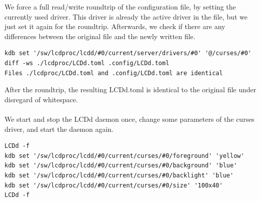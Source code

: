 \documentclass[12pt]{report}
\begin{document}
We force a full read/write roundtrip of the configuration file, by setting the currently used driver. This driver is already the active driver in the file, but we just set it again for the roundtrip.
Afterwards, we check if there are any differences between the original file and the newly written file.
{\small
\begin{verbatim}
kdb set '/sw/lcdproc/lcdd/#0/current/server/drivers/#0' '@/curses/#0'
diff -ws ./lcdproc/LCDd.toml .config/LCDd.toml
Files ./lcdproc/LCDd.toml and .config/LCDd.toml are identical
\end{verbatim}
}
After the roundtrip, the resulting LCDd.toml is identical to the original file under disregard of whitespace.
\\\\
We start and stop the LCDd daemon once, change some parameters of the curses driver, and start the daemon again.
{\small
\begin{verbatim}
LCDd -f
kdb set '/sw/lcdproc/lcdd/#0/current/curses/#0/foreground' 'yellow'
kdb set '/sw/lcdproc/lcdd/#0/current/curses/#0/background' 'blue'
kdb set '/sw/lcdproc/lcdd/#0/current/curses/#0/backlight' 'blue'
kdb set '/sw/lcdproc/lcdd/#0/current/curses/#0/size' '100x40'
LCDd -f
\end{verbatim}
}
\end{document}
